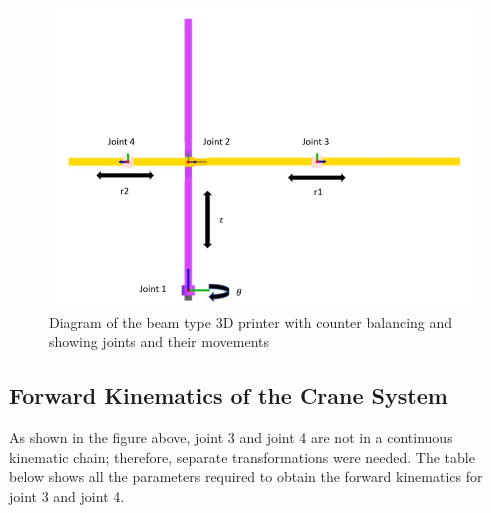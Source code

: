 \documentclass{UoNMCHA}
\numberwithin{equation}{section}
\begin{document}
	\begin{figure}[H]
		\begin{center}
			\includegraphics[width=.8\linewidth]{figs/Picture6}
			\caption{Diagram of the beam type 3D printer with counter balancing and showing joints and their movements}
			\label{figs/Picture6}
		\end{center}
	\end{figure}
	
	\subsection{Forward Kinematics of the Crane System}
	
	As shown in the figure above, joint 3 and joint 4 are not in a continuous kinematic chain; therefore, separate transformations were needed.  The table below shows all the parameters required to obtain the forward kinematics for joint 3 and joint 4.
	
\end{document}
